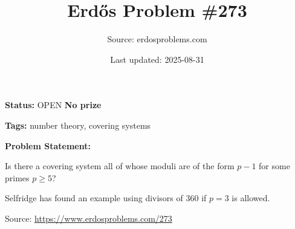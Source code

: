 \documentclass{article}
\title{Erd\H{o}s Problem \#273}
\date{Last updated: 2025-08-31}
\author{Source: erdosproblems.com}
\begin{document}
\maketitle

\noindent\textbf{Status:} OPEN \quad \textbf{No prize}

\noindent\textbf{Tags:} number theory, covering systems

\medskip

\noindent\textbf{Problem Statement:}

Is there a covering system all of whose moduli are of the form $p-1$ for some primes $p\geq 5$?




Selfridge has found an example using divisors of $360$ if $p=3$ is allowed.


\bigskip
\noindent\small{Source: \url{https://www.erdosproblems.com/273}}
\end{document}
